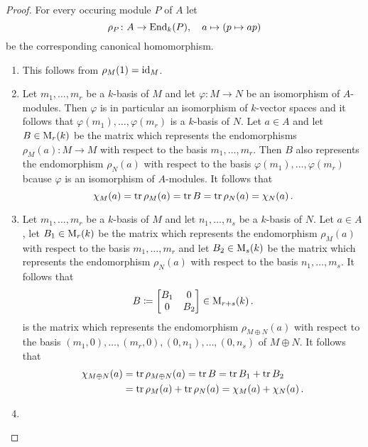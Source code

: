 \begin{proof}
  For every occuring module $P$ of $A$ let
  \[
            \rho_P
    \colon  A
    \to     \operatorname{End}_k(P),
    \quad   a
    \mapsto (p \mapsto ap)
  \]
  be the corresponding canonical homomorphism.
  \begin{enumerate}
    \item
      This follows from $\rho_M(1) = \operatorname{id}_M$.
    \item
      Let $m_1, \dotsc, m_r$ be a $k$-basis of $M$ and let $\varphi \colon M \to N$ be an isomorphism of $A$-modules.
      Then $\varphi$ is in particular an isomorphism of $k$-vector spaces and it follows that $\varphi(m_1), \dotsc, \varphi(m_r)$ is a $k$-basis of $N$.
      Let $a \in A$ and let $B \in \operatorname{M}_r(k)$ be the matrix which represents the endomorphisms $\rho_M(a) \colon M \to M$ with respect to the basis $m_1, \dotsc, m_r$.
      Then $B$ also represents the endomorphism $\rho_N(a)$ with respect to the basis $\varphi(m_1), \dotsc, \varphi(m_r)$ bcause $\varphi$ is an isomorphism of $A$-modules.
      It follows that
      \[
          \chi_M(a)
        = \operatorname{tr} \rho_M(a)
        = \operatorname{tr} B
        = \operatorname{tr} \rho_N(a)
        = \chi_N(a) \,.
      \]
    \item
      Let $m_1, \dotsc, m_r$ be a $k$-basis of $M$ and let $n_1, \dotsc, n_s$ be a $k$-basis of $N$.
      Let $a \in A$, let $B_1 \in \operatorname{M}_r(k)$ be the matrix which represents the endomorphism $\rho_M(a)$ with respect to the basis $m_1, \dotsc, m_r$ and let $B_2 \in \operatorname{M}_s(k)$ be the matrix which represents the endomorphism $\rho_N(a)$ with respect to the basis $n_1, \dotsc, m_s$.
      It follows that
      \[
                  B
        \coloneqq  \begin{bmatrix}
                    B_1 & 0 \\
                    0   & B_2
                  \end{bmatrix}
        \in       \operatorname{M}_{r+s}(k) \,.
      \]
      is the matrix which represents the endomorphism $\rho_{M \oplus N}(a)$ with respect to the basis $(m_1, 0), \dotsc, (m_r, 0), (0, n_1), \dotsc, (0, n_s)$ of $M \oplus N$.
      It follows that
      \begin{align*}
            \chi_{M \oplus N}(a)
        &=  \operatorname{tr} \rho_{M \oplus N}(a)
         =  \operatorname{tr} B
         =  \operatorname{tr} B_1 + \operatorname{tr} B_2 \\
        &=  \operatorname{tr} \rho_M(a) + \operatorname{tr} \rho_N(a)
         =  \chi_M(a) + \chi_N(a) \,.
      \end{align*}
    \item

\end{enumerate}
\end{proof}
